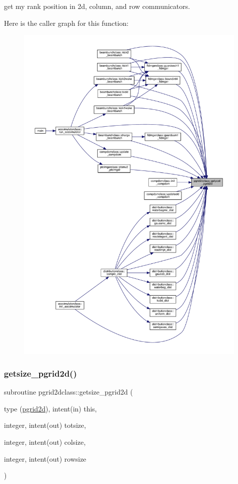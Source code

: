 get my rank position in 2d, column, and row communicators. 

Here is the caller graph for this function\+:\nopagebreak
\begin{figure}[H]
\begin{center}
\leavevmode
\includegraphics[width=350pt]{namespacepgrid2dclass_a559d4550356f88440ae55fceda480de2_icgraph}
\end{center}
\end{figure}
\mbox{\label{namespacepgrid2dclass_ac088657db5b1deb05bb1ec732579ba53}} 
\subsubsection{\texorpdfstring{getsize\_pgrid2d()}{getsize\_pgrid2d()}}
{\footnotesize\ttfamily subroutine pgrid2dclass\+::getsize\+\_\+pgrid2d (\begin{DoxyParamCaption}\item[{type (\mbox{\hyperlink{namespacepgrid2dclass_structpgrid2dclass_1_1pgrid2d}{pgrid2d}}), intent(in)}]{this,  }\item[{integer, intent(out)}]{totsize,  }\item[{integer, intent(out)}]{colsize,  }\item[{integer, intent(out)}]{rowsize }\end{DoxyParamCaption})}



